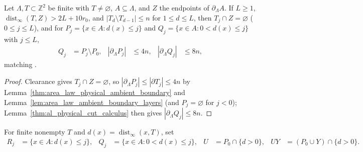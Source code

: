 \begin{lemma}
    \label{thm:al_scan_prefix_boundary}
    \leanok
    Let $\Lambda,T\subset\mathbb Z^2$ be finite with $T\ne\varnothing$,
    $A\subseteq\Lambda$, and $Z$ the endpoints of $\partial_\Lambda A$. If
    $L\ge1$, $\operatorname{dist}_\infty(T,Z)>2L+10r_0$, and
    $|T_d\setminus T_{d-1}|\le n$ for $1\le d\le L$, then $T_j\cap Z=\varnothing$
    ($0\le j\le L$), and for $P_j=\{x\in A:d(x)\le j\}$ and
    $Q_j=\{x\in A:0<d(x)\le j\}$ with $j\le L$,
    \begin{align}
        Q_j                    & = P_j\setminus P_0, &
        |\partial_\Lambda P_j| & \le4n,              &
        |\partial_\Lambda Q_j| & \le8n,
        \label{eq:al_scan_prefix_boundary}
    \end{align}
    matching \cite[Lemma~9.1(2)]{OpenAI2026AreaLaw}.
\end{lemma}
\begin{proof}\leanok
    Clearance gives $T_j\cap Z=\varnothing$, so $|\partial_\Lambda P_j|\le|\partial T_j|\le4n$
    by Lemma~\ref{thm:area_law_physical_ambient_boundary} and
    Lemma~\ref{lem:area_law_ambient_boundary_layers} (and $P_j=\varnothing$ for
    $j<0$); Lemma~\ref{thm:al_physical_cut_calculus} then gives
    $|\partial_\Lambda Q_j|\le8n$.
\end{proof}

\begin{definition}
    \label{def:al_scan_comparison_prefixes}
    \leanok
    For finite nonempty $T$ and $d(x)=\operatorname{dist}_\infty(x,T)$, set
    \begin{align}
        R_j & =\{x\in A:d(x)\le j\},   &
        Q_j & =\{x\in A:0<d(x)\le j\}, &
        U   & =P_0\cap\{d>0\},         &
        UY  & =(P_0\cup Y)\cap\{d>0\}.
        \label{eq:al_scan_comparison_prefixes}
    \end{align}
\end{definition}

